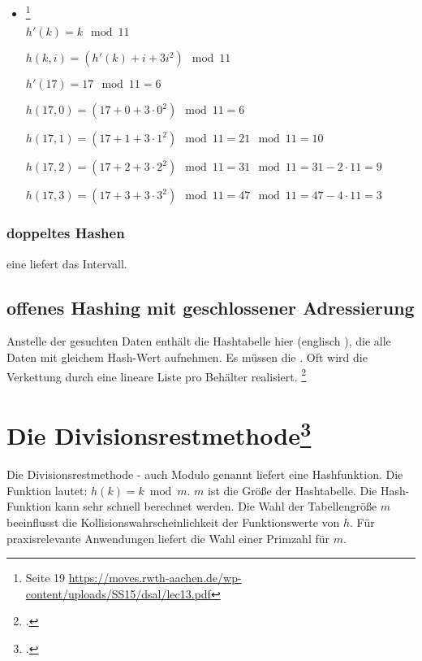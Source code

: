 \documentclass{lehramt-informatik}
\begin{document}
\begin{itemize}
%

\item {}
\footnote{Seite 19 \url{https://moves.rwth-aachen.de/wp-content/uploads/SS15/dsal/lec13.pdf}}

$h'(k) = k \mod 11$

$h(k, i) = (h'(k) + i + 3i^2) \mod 11$

$h'(17) = 17 \mod 11 = 6$


$h(17, 0) = (17 + 0 + 3 \cdot 0^2) \mod 11 = 6$

$h(17, 1) = (17 + 1 + 3 \cdot 1^2) \mod 11 = 21 \mod 11 = 10$

$h(17, 2) = (17 + 2 + 3 \cdot 2^2) \mod 11 = 31 \mod 11 = 31 - 2 \cdot 11 = 9$

$h(17, 3) = (17 + 3 + 3 \cdot 3^2) \mod 11 = 47 \mod 11 = 47 - 4 \cdot 11 = 3$

\end{itemize}

\subsubsection{doppeltes Hashen}

eine  liefert das Intervall.

%

\subsection{offenes Hashing mit geschlossener Adressierung}

Anstelle der gesuchten Daten enthält die Hashtabelle hier
 (englisch ), die alle Daten mit gleichem
Hash-Wert aufnehmen. Es müssen die . Oft wird die Verkettung durch eine lineare Liste pro
Behälter realisiert.
\footcite{wiki:hashtabelle}

%

\section{Die Divisionsrestmethode\footcite{wiki:divisionsrestmethode}}

Die Divisionsrestmethode - auch Modulo genannt liefert eine
Hashfunktion. Die Funktion lautet:  $h(k)=k{\bmod {m}}$. $m$ ist die
Größe der Hashtabelle. Die Hash-Funktion kann sehr schnell berechnet
werden. Die Wahl der Tabellengröße $m$ beeinflusst die
Kollisionswahrscheinlichkeit der Funktionswerte von $h$. Für
praxisrelevante Anwendungen liefert die Wahl einer Primzahl für $m$.
\end{document}
